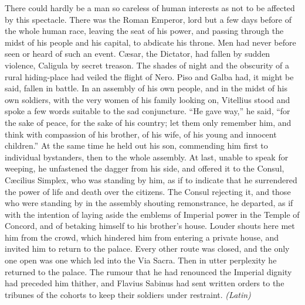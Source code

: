 
There could hardly be a man so careless of human interests as not to be affected by this spectacle. There was the Roman Emperor, lord but a few days before of the whole human race, leaving the seat of his power, and passing through the midst of his people and his capital, to abdicate his throne. Men had never before seen or heard of such an event. Cæsar, the Dictator, had fallen by sudden violence, Caligula by secret treason. The shades of night and the obscurity of a rural hiding-place had veiled the flight of Nero. Piso and Galba had, it might be said, fallen in battle. In an assembly of his own people, and in the midst of his own soldiers, with the very women of his family looking on, Vitellius stood and spoke a few words suitable to the sad conjuncture. ``He gave way,'' he said, ``for the sake of peace, for the sake of his country; let them only remember him, and think with compassion of his brother, of his wife, of his young and innocent children.'' At the same time he held out his son, commending him first to individual bystanders, then to the whole assembly. At last, unable to speak for weeping, he unfastened the dagger from his side, and offered it to the Consul, Cæcilius Simplex, who was standing by him, as if to indicate that he surrendered the power of life and death over the citizens. The Consul rejecting it, and those who were standing by in the assembly shouting remonstrance, he departed, as if with the intention of laying aside the emblems of Imperial power in the Temple of Concord, and of betaking himself to his brother's house. Louder shouts here met him from the crowd, which hindered him from entering a private house, and invited him to return to the palace. Every other route was closed, and the only one open was one which led into the Via Sacra. Then in utter perplexity he returned to the palace. The rumour that he had renounced the Imperial dignity had preceded him thither, and Flavius Sabinus had sent written orders to the tribunes of the cohorts to keep their soldiers under restraint. \emph{(Latin)}


